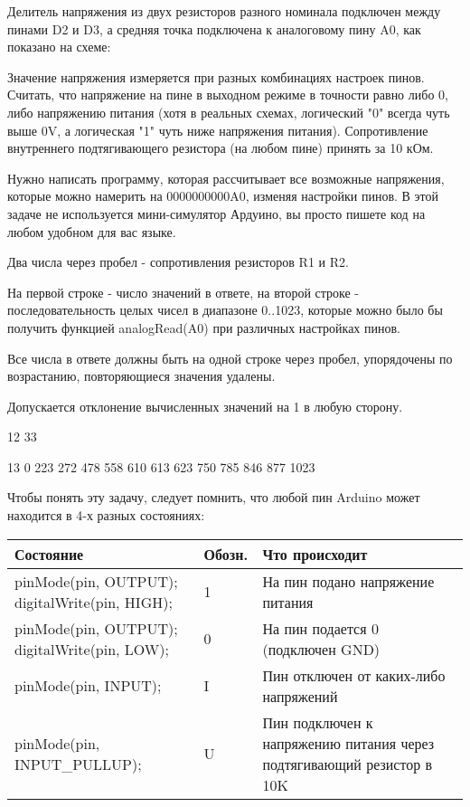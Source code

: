 
Делитель напряжения из двух резисторов разного номинала подключен между пинами D2 и D3, а средняя точка подключена к аналоговому пину A0, как показано на схеме:


Значение напряжения измеряется при разных комбинациях настроек пинов. Считать, что напряжение на пине в выходном режиме в точности равно либо 0, либо напряжению питания (хотя в реальных схемах, логический "0" всегда чуть выше 0V, а логическая "1" чуть ниже напряжения питания). Сопротивление внутреннего подтягивающего резистора (на любом пине) принять за 10 кОм.  

Нужно написать программу, которая рассчитывает все возможные напряжения, которые можно намерить на 0000000000A0, изменяя настройки пинов.  В этой задаче не используется мини-симулятор Ардуино, вы просто пишете код на любом удобном для вас языке.

Два числа через пробел - сопротивления резисторов R1 и R2.

\outputfmtSection
На первой строке - число значений в ответе, на второй строке - последовательность целых чисел в диапазоне 0..1023, 
которые можно было бы получить функцией analogRead(A0) при различных настройках пинов.  

Все числа в ответе должны быть  на одной строке через пробел,  упорядочены по возрастанию,  
повторяющиеся значения удалены. 

Допускается отклонение вычисленных значений на 1 в любую сторону.

\begin{myverbbox}[\small]{\vinput}
    12 33
\end{myverbbox}
\begin{myverbbox}[\small]{\voutput}
    13
    0 223 272 478 558 610 613 623 750 785 846 877 1023
\end{myverbbox}

\solutionSection

Чтобы понять эту задачу, следует помнить, что любой пин Arduino может находится в 4-х разных состояниях:
\begin{tabular}{|p{3.5cm}|p{1.5cm}|p{6cm}|}
    \hline
    Состояние&Обозн.&Что происходит \\
    \hline
    pinMode(pin, OUTPUT);
    digitalWrite(pin,  HIGH);& 1& На пин подано напряжение питания\\
    \hline
    pinMode(pin, OUTPUT);
    digitalWrite(pin,  LOW); & 0 & На пин подается 0 (подключен GND) \\
    \hline
    pinMode(pin, INPUT); &I &Пин отключен от каких-либо напряжений \\
    \hline
    pinMode(pin, INPUT\_PULLUP);& U & Пин подключен к напряжению питания через подтягивающий резистор в 10K \\
    \hline
\end{tabular}
 
